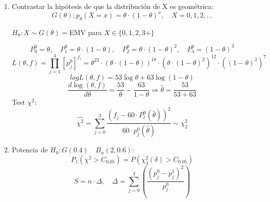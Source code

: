 \begin{enumerate}[label=\alph*)]
    \item Contrastar la hipótesis de que la distribución de X es geométrica:
    \[
        G(\theta);p_\theta(X=x)=\theta \cdot (1- \theta)^x, \quad X=0,1,2,\dots
    \]

    $H_0: X \sim G(\theta)=$EMV para $X \in \{0,1,2,3+\}$

    \[
        P_0^0=\theta, \quad P_1^0=\theta \cdot (1-\theta), \quad P_2^0=\theta \cdot (1-\theta)^2, \quad P_3^0=(1-\theta)^3
    \]
    \[
        L(\theta,f)=\prod_{j=1}^{4}[p_j^0]^{f_i}= \theta^{23}\cdot(\theta \cdot (1-\theta))^18 \cdot (\theta \cdot (1-\theta)^2)^12 \cdot ((1-\theta)^3)^7
    \]
    \[
        log L(\theta,f)=53 \log \theta+63 \log (1-\theta)
    \]
    \[
        \frac{d \log(\theta,f)}{d \theta}=\frac{53}{\theta}-\frac{63}{1-\theta} \Longrightarrow \widehat{\theta}=\frac{53}{53+63}
    \]
    Test $\chi^2$:
    \[
        \widehat{\chi^2}=\sum_{j=0}^{3} \frac{(f_j-60\cdot P_l^0(\widehat{\theta}))^2}{60 \cdot p_j^0(\widehat{\theta})} \sim \chi^2_2
    \]

    \item Potencia de $H_0:G(0.4) \quad B_n(2,0.6)$:
    \[
        P_1(\chi^2> C_{0.05})=P(\chi_3^2(\delta)>C_{0.05})
    \]
    \[
        S=n \cdot \Delta, \quad \Delta=\sum_{j=0}^{3} \left(\frac{(p_j^0-p_j^1)^2}{p_j^0}\right)
    \]
\end{enumerate}
